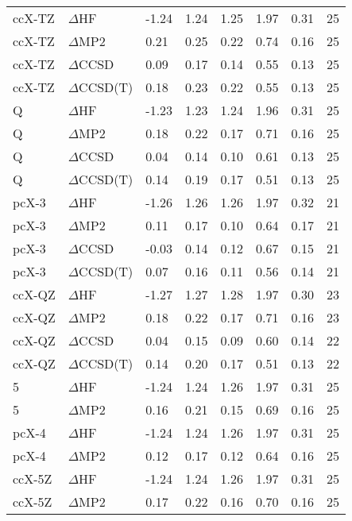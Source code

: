 \begin{table}
\begin{tabular}{l l l l l l l l }
    ccX-TZ & $\Delta$HF & -1.24 & 1.24 & 1.25 & 1.97 & 0.31 & 25 \\ 
    ccX-TZ & $\Delta$MP2 & 0.21 & 0.25 & 0.22 & 0.74 & 0.16 & 25 \\ 
    ccX-TZ & $\Delta$CCSD & 0.09 & 0.17 & 0.14 & 0.55 & 0.13 & 25 \\ 
    ccX-TZ & $\Delta$CCSD(T) & 0.18 & 0.23 & 0.22 & 0.55 & 0.13 & 25 \\ 
    Q & $\Delta$HF & -1.23 & 1.23 & 1.24 & 1.96 & 0.31 & 25 \\ 
    Q & $\Delta$MP2 & 0.18 & 0.22 & 0.17 & 0.71 & 0.16 & 25 \\ 
    Q & $\Delta$CCSD & 0.04 & 0.14 & 0.10 & 0.61 & 0.13 & 25 \\ 
    Q & $\Delta$CCSD(T) & 0.14 & 0.19 & 0.17 & 0.51 & 0.13 & 25 \\ 
    pcX-3 & $\Delta$HF & -1.26 & 1.26 & 1.26 & 1.97 & 0.32 & 21 \\ 
    pcX-3 & $\Delta$MP2 & 0.11 & 0.17 & 0.10 & 0.64 & 0.17 & 21 \\ 
    pcX-3 & $\Delta$CCSD & -0.03 & 0.14 & 0.12 & 0.67 & 0.15 & 21 \\ 
    pcX-3 & $\Delta$CCSD(T) & 0.07 & 0.16 & 0.11 & 0.56 & 0.14 & 21 \\ 
    ccX-QZ & $\Delta$HF & -1.27 & 1.27 & 1.28 & 1.97 & 0.30 & 23 \\ 
    ccX-QZ & $\Delta$MP2 & 0.18 & 0.22 & 0.17 & 0.71 & 0.16 & 23 \\ 
    ccX-QZ & $\Delta$CCSD & 0.04 & 0.15 & 0.09 & 0.60 & 0.14 & 22 \\ 
    ccX-QZ & $\Delta$CCSD(T) & 0.14 & 0.20 & 0.17 & 0.51 & 0.13 & 22 \\ 
    5 & $\Delta$HF & -1.24 & 1.24 & 1.26 & 1.97 & 0.31 & 25 \\ 
    5 & $\Delta$MP2 & 0.16 & 0.21 & 0.15 & 0.69 & 0.16 & 25 \\ 
    pcX-4 & $\Delta$HF & -1.24 & 1.24 & 1.26 & 1.97 & 0.31 & 25 \\ 
    pcX-4 & $\Delta$MP2 & 0.12 & 0.17 & 0.12 & 0.64 & 0.16 & 25 \\ 
    ccX-5Z & $\Delta$HF & -1.24 & 1.24 & 1.26 & 1.97 & 0.31 & 25 \\ 
    ccX-5Z & $\Delta$MP2 & 0.17 & 0.22 & 0.16 & 0.70 & 0.16 & 25 \\ 
    \bottomrule
  \end{tabular}
\end{table}
